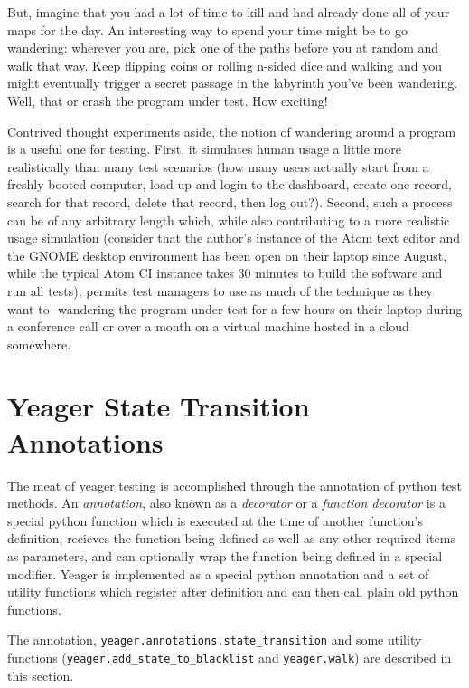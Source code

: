 But, imagine that you had a lot of time to kill and had already done all of your maps for the day. An interesting way to spend your time might be to go wandering: wherever you are, pick one of the paths before you at random and walk that way. Keep flipping coins or rolling n-sided dice and walking and you might eventually trigger a secret passage in the labyrinth you've been wandering. Well, that or crash the program under test. How exciting!

Contrived thought experiments aside, the notion of wandering around a program is a useful one for testing. First, it simulates human usage a little more realistically than many test scenarios (how many users actually start from a freshly booted computer, load up and login to the dashboard, create one record, search for that record, delete that record, then log out?). Second, such a process can be of any arbitrary length which, while also contributing to a more realistic usage simulation (consider that the author's instance of the Atom text editor and the GNOME desktop environment has been open on their laptop since August, while the typical Atom CI instance takes 30 minutes to build the software and run all tests\citep{CircleCI}), permits test managers to use as much of the technique as they want to- wandering the program under test for a few hours on their laptop during a conference call or over a month on a virtual machine hosted in a cloud somewhere.

\section{Yeager State Transition Annotations}
The meat of yeager testing is accomplished through the annotation of python test methods. An \textit{annotation}, also known as a \textit{decorator} or a \textit{function decorator} is a special python function which is executed at the time of another function's definition, recieves the function being defined as well as any other required items as parameters, and can optionally wrap the function being defined in a special modifier. Yeager is implemented as a special python annotation and a set of utility functions which register after definition and can then call plain old python functions.

The annotation, \texttt{yeager.annotations.state\_transition} and some utility functions (\texttt{yeager.add\_state\_to\_blacklist} and \texttt{yeager.walk}) are described in this section.

